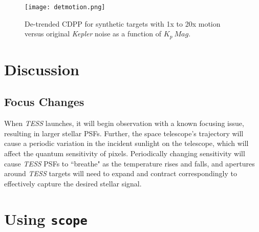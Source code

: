 \documentclass[12pt,preprint]{aastex}
\begin{document}
\begin{figure}[h]
	\centering
	\texttt{[image: detmotion.png]}
	\caption{De-trended CDPP for synthetic targets with 1x to 20x motion versus original \textit{Kepler} noise as a function of $K_p\ Mag$.}
	\label{fig:detmotion}
\end{figure}


\section{Discussion}

\subsection{Focus Changes}

When \textit{TESS} launches, it will begin observation with a known focusing issue, resulting in larger stellar PSFs. Further, the space telescope's trajectory will cause a periodic variation in the incident sunlight on the telescope, which will affect the quantum sensitivity of pixels. Periodically changing sensitivity will cause \textit{TESS} PSFs to ``breathe" as the temperature rises and falls, and apertures around \textit{TESS} targets will need to expand and contract correspondingly to effectively capture the desired stellar signal.

\section{Using \texttt{scope}}
\end{document}
